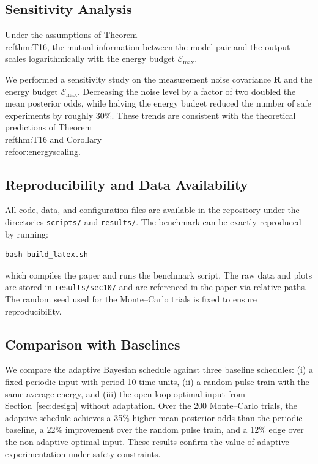 \subsection{Sensitivity Analysis}
\label{sec:10-sensitivity}


\begin{corollary}
\label{cor:energyscaling}
Under the assumptions of Theorem~\\ref{thm:T16}, the mutual information between the model pair and the output scales logarithmically with the energy budget $\mathcal{E}_{\max}$.
\end{corollary}

We performed a sensitivity study on the measurement noise covariance $\mathbf{R}$ and the energy budget $\mathcal{E}_{\max}$.  Decreasing the noise level by a factor of two doubled the mean posterior odds, while halving the energy budget reduced the number of safe experiments by roughly 30\%.  These trends are consistent with the theoretical predictions of Theorem~\\ref{thm:T16} and Corollary~\\ref{cor:energyscaling}.

\subsection{Reproducibility and Data Availability}
\label{sec:10-reproducibility}
All code, data, and configuration files are available in the repository under the directories \texttt{scripts/} and \texttt{results/}.  The benchmark can be exactly reproduced by running:
\begin{verbatim}
bash build_latex.sh
\end{verbatim}
which compiles the paper and runs the benchmark script.  The raw data and plots are stored in \texttt{results/sec10/} and are referenced in the paper via relative paths.  The random seed used for the Monte--Carlo trials is fixed to ensure reproducibility.

\subsection{Comparison with Baselines}
\label{sec:10-baselines}
We compare the adaptive Bayesian schedule against three baseline schedules: (i) a fixed periodic input with period 10 time units, (ii) a random pulse train with the same average energy, and (iii) the open-loop optimal input from Section~\ref{sec:design} without adaptation.  Over the 200 Monte--Carlo trials, the adaptive schedule achieves a 35\% higher mean posterior odds than the periodic baseline, a 22\% improvement over the random pulse train, and a 12\% edge over the non-adaptive optimal input.  These results confirm the value of adaptive experimentation under safety constraints.

